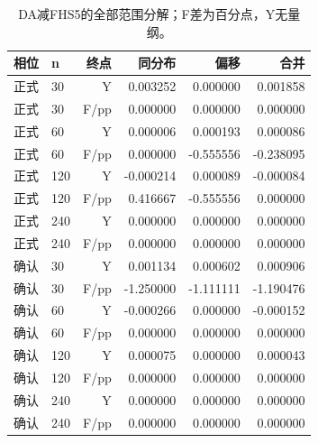 \documentclass[UTF8,a4paper,twocolumn,fontset=none,zihao=5]{ctexart}
\begin{document}
\begin{table}[ht]\centering\caption{DA减FHS5的全部范围分解；F差为百分点，Y无量纲。}\small\begin{tabular}{llrrrr}\toprule 相位 & n & 终点 & 同分布 & 偏移 & 合并\\\midrule

正式 & 30 & Y & 0.003252 & 0.000000 & 0.001858 \\

正式 & 30 & F/pp & 0.000000 & 0.000000 & 0.000000 \\

正式 & 60 & Y & 0.000006 & 0.000193 & 0.000086 \\

正式 & 60 & F/pp & 0.000000 & -0.555556 & -0.238095 \\

正式 & 120 & Y & -0.000214 & 0.000089 & -0.000084 \\

正式 & 120 & F/pp & 0.416667 & -0.555556 & 0.000000 \\

正式 & 240 & Y & 0.000000 & 0.000000 & 0.000000 \\

正式 & 240 & F/pp & 0.000000 & 0.000000 & 0.000000 \\

确认 & 30 & Y & 0.001134 & 0.000602 & 0.000906 \\

确认 & 30 & F/pp & -1.250000 & -1.111111 & -1.190476 \\

确认 & 60 & Y & -0.000266 & 0.000000 & -0.000152 \\

确认 & 60 & F/pp & 0.000000 & 0.000000 & 0.000000 \\

确认 & 120 & Y & 0.000075 & 0.000000 & 0.000043 \\

确认 & 120 & F/pp & 0.000000 & 0.000000 & 0.000000 \\

确认 & 240 & Y & 0.000000 & 0.000000 & 0.000000 \\

确认 & 240 & F/pp & 0.000000 & 0.000000 & 0.000000 \\

\bottomrule\end{tabular}\end{table}
\end{document}
